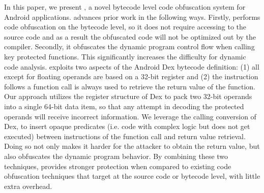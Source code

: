 %

In this paper, we present \ToolName, a novel bytecode level code obfuscation system for Android applications. \ToolName advances prior work in the following ways. Firstly, \ToolName performs code obfuscation on the bytecode level, so it does not require accessing to the source code and as a result the obfuscated code will not be optimized out by the compiler. Secondly, it obfuscates the dynamic program control flow when calling key protected functions. This significantly increases the difficulty for dynamic code analysis. \ToolName exploits two aspects of the Android Dex bytecode definition: (1) all except for floating operands are based on a 32-bit register and (2) the instruction follows a function call is always used to retrieve the return value of the function. Our approach utilizes the register structure of Dex to pack two 32-bit operands into a single 64-bit data item, so that any attempt in decoding the protected operands will receive incorrect information. We leverage the calling conversion of Dex, to insert opaque predicates (i.e. code with complex logic but does not get executed) between instructions of the function call and return value retrieval. Doing so not only makes it harder for the attacker to obtain the return value, but also obfuscates the dynamic program behavior. By combining these two techniques, \ToolName provides stronger protection when compared to existing code obfuscation techniques that target at the source code or bytecode level, with little extra overhead.  


